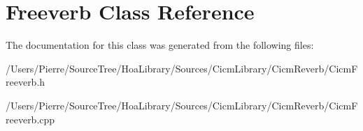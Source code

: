 \hypertarget{class_freeverb}{\section{Freeverb Class Reference}
\label{class_freeverb}
}


The documentation for this class was generated from the following files\-:\begin{DoxyCompactItemize}
\item 
/\-Users/\-Pierre/\-Source\-Tree/\-Hoa\-Library/\-Sources/\-Cicm\-Library/\-Cicm\-Reverb/Cicm\-Freeverb.\-h\item 
/\-Users/\-Pierre/\-Source\-Tree/\-Hoa\-Library/\-Sources/\-Cicm\-Library/\-Cicm\-Reverb/Cicm\-Freeverb.\-cpp\end{DoxyCompactItemize}
